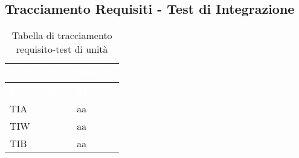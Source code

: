 \subsection{Tracciamento Requisiti - Test di Integrazione}
{
\renewcommand{\arraystretch}{1.5}
\centering
\begin{longtable}{C{2cm} C{8cm}}
\caption{Tabella di tracciamento requisito-test di unità}\\
\textcolor{white}{\textbf{Codice Test}} & \textcolor{white}{\textbf{Metodo}}\\	
\endfirsthead
{}
\textcolor{white}{\textbf{Codice Test}} & \textcolor{white}{\textbf{Metodo}}\\	
\endhead

TIA & aa \\
TIW & aa \\
TIB & aa \\

\end{longtable}
}